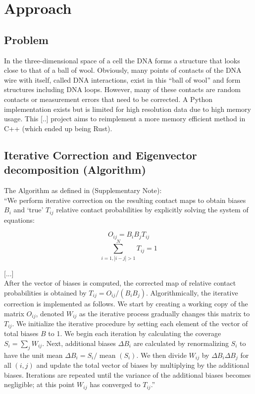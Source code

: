 \chapter{Approach}\label{chap:approach}


\section{Problem}\label{sec:problem}

In the three-dimensional space of a cell the DNA forms a structure that looks
close to that of a ball of wool. Obviously, many points of contacts of the DNA
wire with itself, called DNA interactions, exist in this ``ball of wool'' and
form structures including DNA loops. However, many of these contacts are
random contacts or measurement errors that need to be corrected. A Python
implementation exists but is limited for high resolution data due to high
memory usage. This [..] project aims to reimplement a more memory efficient
method in C++ (which ended up being Rust).



\section{Iterative Correction and Eigenvector decomposition (Algorithm)}\label{sec:ICE}

The Algorithm as defined in \cite{imakaev2012iterative} (Supplementary Note): \\
``We perform iterative correction on the resulting contact maps to obtain
biases $B_i$ and `true' $T_{ij}$ relative contact probabilities by explicitly
solving the system of equations:

$$ O_{ij} = B_i B_j T_{ij} $$
$$ \sum^N_{i=1, |i-j|>1} T_{ij} = 1$$

[...] \\
After the vector of biases is computed, the corrected map of relative
contact probabilities is obtained by $T_{ij} = O_{ij} / (B_i B_j)$.
Algorithmically, the iterative correction is implemented as follows. We start
by creating a working copy of the matrix $O_{ij}$, denoted $W_{ij}$ as the
iterative process gradually changes this matrix to $T_{ij}$. We initialize the
iterative procedure by setting each element of the vector of total biases $B$
to 1. We begin each iteration by calculating the coverage $S_i = \sum_j
W_{ij}$. Next, additional biases $\Delta B_i$ are calculated by renormalizing
$S_i$ to have the unit mean $\Delta B_i = S_i /$ mean $(S_i)$. We then divide
$W_{ij}$ by $\Delta B_i \Delta B_j$ for all $(i, j)$ and update the total
vector of biases by multiplying by the additional biases. Iterations are
repeated until the variance of the additional biases becomes negligible; at
this point $W_{ij}$ has converged to $T_{ij}$.'' \\

